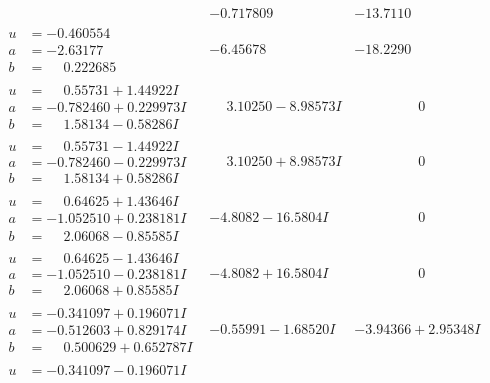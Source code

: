 \documentclass[1p]{elsarticle_modified}
\theoremstyle{definition}
\begin{document}
$$\begin{array}{c|c|c}
 & -0.717809\phantom{ +0.000000I} & -13.7110\phantom{ +0.000000I} \\ \hline\begin{aligned}
u &= -0.460554\phantom{ +0.000000I} \\
a &= -2.63177\phantom{ +0.000000I} \\
b &= \phantom{-}0.222685\phantom{ +0.000000I}\end{aligned}
 & -6.45678\phantom{ +0.000000I} & -18.2290\phantom{ +0.000000I} \\ \hline\begin{aligned}
u &= \phantom{-}0.55731 + 1.44922 I \\
a &= -0.782460 + 0.229973 I \\
b &= \phantom{-}1.58134 - 0.58286 I\end{aligned}
 & \phantom{-}3.10250 - 8.98573 I & \phantom{-0.000000 } 0 \\ \hline\begin{aligned}
u &= \phantom{-}0.55731 - 1.44922 I \\
a &= -0.782460 - 0.229973 I \\
b &= \phantom{-}1.58134 + 0.58286 I\end{aligned}
 & \phantom{-}3.10250 + 8.98573 I & \phantom{-0.000000 } 0 \\ \hline\begin{aligned}
u &= \phantom{-}0.64625 + 1.43646 I \\
a &= -1.052510 + 0.238181 I \\
b &= \phantom{-}2.06068 - 0.85585 I\end{aligned}
 & -4.8082 - 16.5804 I & \phantom{-0.000000 } 0 \\ \hline\begin{aligned}
u &= \phantom{-}0.64625 - 1.43646 I \\
a &= -1.052510 - 0.238181 I \\
b &= \phantom{-}2.06068 + 0.85585 I\end{aligned}
 & -4.8082 + 16.5804 I & \phantom{-0.000000 } 0 \\ \hline\begin{aligned}
u &= -0.341097 + 0.196071 I \\
a &= -0.512603 + 0.829174 I \\
b &= \phantom{-}0.500629 + 0.652787 I\end{aligned}
 & -0.55991 - 1.68520 I & -3.94366 + 2.95348 I \\ \hline\begin{aligned}
u &= -0.341097 - 0.196071 I \\

\end{aligned}
\end{array}$$
\end{document}
